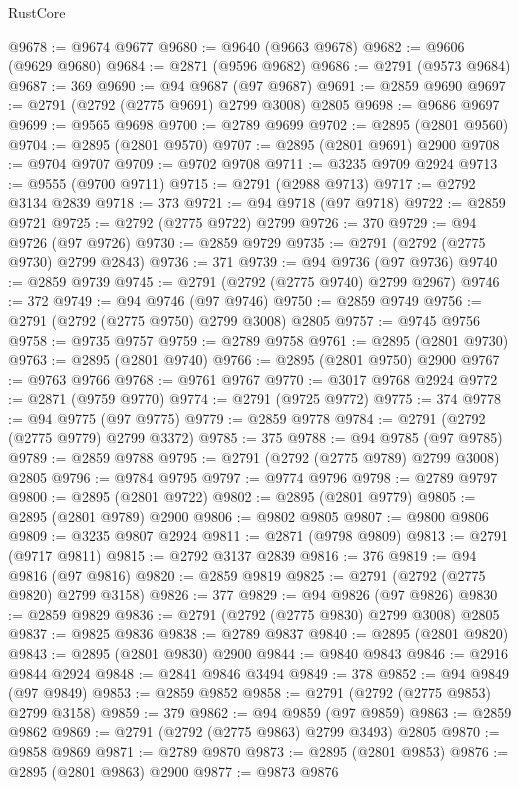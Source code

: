 \begin{lexlean}{RustCore}
\begin{coremodule}
@9678 := @9674 @9677
@9680 := @9640 (@9663 @9678)
@9682 := @9606 (@9629 @9680)
@9684 := @2871 (@9596 @9682)
@9686 := @2791 (@9573 @9684)
@9687 := 369
@9690 := @94 @9687 (@97 @9687)
@9691 := @2859 @9690
@9697 := @2791 (@2792 (@2775 @9691) @2799 @3008) @2805
@9698 := @9686 @9697
@9699 := @9565 @9698
@9700 := @2789 @9699
@9702 := @2895 (@2801 @9560)
@9704 := @2895 (@2801 @9570)
@9707 := @2895 (@2801 @9691) @2900
@9708 := @9704 @9707
@9709 := @9702 @9708
@9711 := @3235 @9709 @2924
@9713 := @9555 (@9700 @9711)
@9715 := @2791 (@2988 @9713)
@9717 := @2792 @3134 @2839
@9718 := 373
@9721 := @94 @9718 (@97 @9718)
@9722 := @2859 @9721
@9725 := @2792 (@2775 @9722) @2799
@9726 := 370
@9729 := @94 @9726 (@97 @9726)
@9730 := @2859 @9729
@9735 := @2791 (@2792 (@2775 @9730) @2799 @2843)
@9736 := 371
@9739 := @94 @9736 (@97 @9736)
@9740 := @2859 @9739
@9745 := @2791 (@2792 (@2775 @9740) @2799 @2967)
@9746 := 372
@9749 := @94 @9746 (@97 @9746)
@9750 := @2859 @9749
@9756 := @2791 (@2792 (@2775 @9750) @2799 @3008) @2805
@9757 := @9745 @9756
@9758 := @9735 @9757
@9759 := @2789 @9758
@9761 := @2895 (@2801 @9730)
@9763 := @2895 (@2801 @9740)
@9766 := @2895 (@2801 @9750) @2900
@9767 := @9763 @9766
@9768 := @9761 @9767
@9770 := @3017 @9768 @2924
@9772 := @2871 (@9759 @9770)
@9774 := @2791 (@9725 @9772)
@9775 := 374
@9778 := @94 @9775 (@97 @9775)
@9779 := @2859 @9778
@9784 := @2791 (@2792 (@2775 @9779) @2799 @3372)
@9785 := 375
@9788 := @94 @9785 (@97 @9785)
@9789 := @2859 @9788
@9795 := @2791 (@2792 (@2775 @9789) @2799 @3008) @2805
@9796 := @9784 @9795
@9797 := @9774 @9796
@9798 := @2789 @9797
@9800 := @2895 (@2801 @9722)
@9802 := @2895 (@2801 @9779)
@9805 := @2895 (@2801 @9789) @2900
@9806 := @9802 @9805
@9807 := @9800 @9806
@9809 := @3235 @9807 @2924
@9811 := @2871 (@9798 @9809)
@9813 := @2791 (@9717 @9811)
@9815 := @2792 @3137 @2839
@9816 := 376
@9819 := @94 @9816 (@97 @9816)
@9820 := @2859 @9819
@9825 := @2791 (@2792 (@2775 @9820) @2799 @3158)
@9826 := 377
@9829 := @94 @9826 (@97 @9826)
@9830 := @2859 @9829
@9836 := @2791 (@2792 (@2775 @9830) @2799 @3008) @2805
@9837 := @9825 @9836
@9838 := @2789 @9837
@9840 := @2895 (@2801 @9820)
@9843 := @2895 (@2801 @9830) @2900
@9844 := @9840 @9843
@9846 := @2916 @9844 @2924
@9848 := @2841 @9846 @3494
@9849 := 378
@9852 := @94 @9849 (@97 @9849)
@9853 := @2859 @9852
@9858 := @2791 (@2792 (@2775 @9853) @2799 @3158)
@9859 := 379
@9862 := @94 @9859 (@97 @9859)
@9863 := @2859 @9862
@9869 := @2791 (@2792 (@2775 @9863) @2799 @3493) @2805
@9870 := @9858 @9869
@9871 := @2789 @9870
@9873 := @2895 (@2801 @9853)
@9876 := @2895 (@2801 @9863) @2900
@9877 := @9873 @9876

\end{coremodule}
\end{lexlean}
